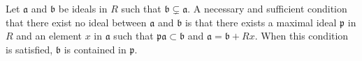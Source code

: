 Let $\mathfrak{a}$ and $\mathfrak{b}$ be ideals in $R$ such that $\mathfrak{b} \subsetneq \mathfrak{a}$. A necessary and sufficient condition that there exist no ideal between $\mathfrak{a}$ and $\mathfrak{b}$ is that there exists a maximal ideal $\mathfrak{p}$ in $R$ and an element $x$ in $\mathfrak{a}$ such that $\mathfrak{p}\mathfrak{a} \subset \mathfrak{b}$ and $\mathfrak{a} = \mathfrak{b} + Rx$. When this condition is satisfied, $\mathfrak{b}$ is contained in $\mathfrak{p}$.
